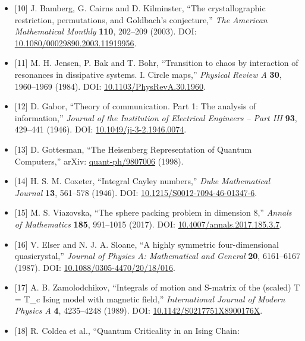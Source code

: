 \documentclass[
  a4paper,
]{article}
\begin{document}
\begin{itemize}
  (1984). DOI:
  \href{https://doi.org/10.1103/PhysRevLett.53.1951}{10.1103/PhysRevLett.53.1951}.
\item
  {[}10{]} J. Bamberg, G. Cairns and D. Kilminster, ``The
  crystallographic restriction, permutations, and Goldbach's
  conjecture,'' \emph{The American Mathematical Monthly} \textbf{110},
  202--209 (2003). DOI:
  \href{https://doi.org/10.1080/00029890.2003.11919956}{10.1080/00029890.2003.11919956}.
\item
  {[}11{]} M. H. Jensen, P. Bak and T. Bohr, ``Transition to chaos by
  interaction of resonances in dissipative systems. I. Circle maps,''
  \emph{Physical Review A} \textbf{30}, 1960--1969 (1984). DOI:
  \href{https://doi.org/10.1103/PhysRevA.30.1960}{10.1103/PhysRevA.30.1960}.
\item
  {[}12{]} D. Gabor, ``Theory of communication. Part 1: The analysis of
  information,'' \emph{Journal of the Institution of Electrical
  Engineers -- Part III} \textbf{93}, 429--441 (1946). DOI:
  \href{https://doi.org/10.1049/ji-3-2.1946.0074}{10.1049/ji-3-2.1946.0074}.
\item
  {[}13{]} D. Gottesman, ``The Heisenberg Representation of Quantum
  Computers,'' arXiv:
  \href{https://arxiv.org/abs/quant-ph/9807006}{quant-ph/9807006}
  (1998).
\item
  {[}14{]} H. S. M. Coxeter, ``Integral Cayley numbers,'' \emph{Duke
  Mathematical Journal} \textbf{13}, 561--578 (1946). DOI:
  \href{https://doi.org/10.1215/S0012-7094-46-01347-6}{10.1215/S0012-7094-46-01347-6}.
\item
  {[}15{]} M. S. Viazovska, ``The sphere packing problem in dimension
  8,'' \emph{Annals of Mathematics} \textbf{185}, 991--1015 (2017). DOI:
  \href{https://doi.org/10.4007/annals.2017.185.3.7}{10.4007/annals.2017.185.3.7}.
\item
  {[}16{]} V. Elser and N. J. A. Sloane, ``A highly symmetric
  four-dimensional quasicrystal,'' \emph{Journal of Physics A:
  Mathematical and General} \textbf{20}, 6161--6167 (1987). DOI:
  \href{https://doi.org/10.1088/0305-4470/20/18/016}{10.1088/0305-4470/20/18/016}.
\item
  {[}17{]} A. B. Zamolodchikov, ``Integrals of motion and S-matrix of
  the (scaled) T = T\_c Ising model with magnetic field,''
  \emph{International Journal of Modern Physics A} \textbf{4},
  4235--4248 (1989). DOI:
  \href{https://doi.org/10.1142/S0217751X8900176X}{10.1142/S0217751X8900176X}.
\item
  {[}18{]} R. Coldea et al., ``Quantum Criticality in an Ising Chain:

\end{itemize}
\end{document}
